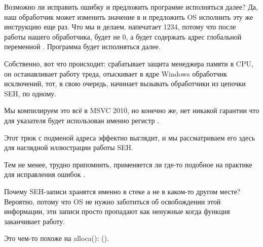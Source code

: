 

Возможно ли  исправить ошибку и предложить программе исполняться далее?
Да, наш обработчик может изменить значение в \EAX и предложить \ac{OS} исполнить эту же инструкцию еще раз.
Что мы и делаем. \printf напечатает 1234, потому что после работы нашего обработчика, \EAX будет не 0,
а будет содержать адрес глобальной переменной .
Программа будет исполняться далее.

Собственно, вот что происходит: срабатывает защита менеджера памяти в \ac{CPU}, 
он останавливает работу треда, отыскивает в ядре Windows обработчик исключений, 
тот, в свою очередь, начинает вызывать обработчики из цепочки \ac{SEH}, по одному.

Мы компилируем это всё в MSVC 2010, но конечно же, нет никакой гарантии 
что для указателя будет использован именно регистр \EAX.

Этот трюк с подменой адреса эффектно выглядит, и мы рассматриваем его здесь для наглядной иллюстрации работы \ac{SEH}.

Тем не менее, трудно припомнить, применяется ли где-то подобное на практике для исправления ошибок .

Почему SEH-записи хранятся именно в стеке а не в каком-то другом месте?
Вероятно, потому что \ac{OS} не нужно заботиться об освобождении этой информации, эти записи
просто пропадают как ненужные когда функция заканчивает работу.

Это чем-то похоже на alloca(): ().

